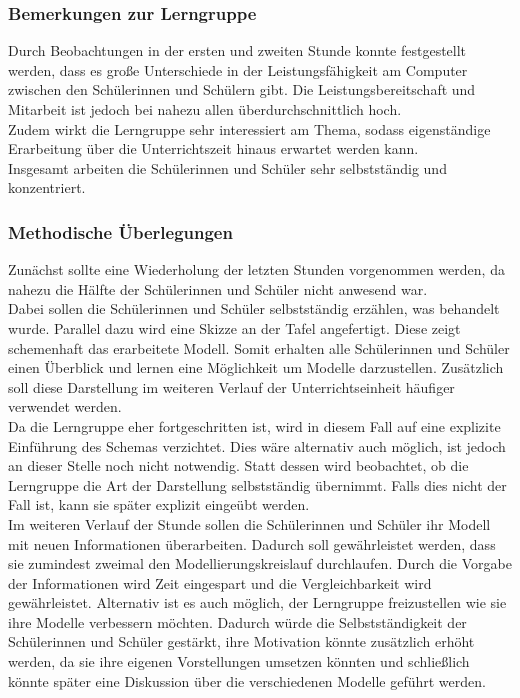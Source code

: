 \subsubsection{Bemerkungen zur Lerngruppe}
Durch Beobachtungen in der ersten und zweiten Stunde konnte festgestellt werden, dass es große Unterschiede in der Leistungsfähigkeit am Computer zwischen den Schülerinnen und Schülern gibt. Die Leistungsbereitschaft und Mitarbeit ist jedoch bei nahezu allen überdurchschnittlich hoch.\\ Zudem wirkt die Lerngruppe sehr interessiert am Thema, sodass eigenständige Erarbeitung über die Unterrichtszeit hinaus erwartet werden kann.\\
  Insgesamt arbeiten die Schülerinnen und Schüler sehr selbstständig und konzentriert. 
\subsubsection{Methodische Überlegungen}
Zunächst sollte eine Wiederholung der letzten Stunden vorgenommen werden, da nahezu die Hälfte der Schülerinnen und Schüler nicht anwesend war.\\
Dabei sollen die Schülerinnen und Schüler selbstständig erzählen, was behandelt wurde. Parallel dazu wird eine Skizze an der Tafel angefertigt. Diese zeigt schemenhaft das erarbeitete Modell. Somit erhalten alle Schülerinnen und Schüler einen Überblick und lernen eine Möglichkeit um Modelle darzustellen. Zusätzlich soll diese Darstellung im weiteren Verlauf der Unterrichtseinheit häufiger verwendet werden.\\
Da die Lerngruppe eher fortgeschritten ist, wird in diesem Fall auf eine explizite Einführung des Schemas verzichtet. Dies wäre alternativ auch möglich, ist jedoch an dieser Stelle noch nicht notwendig. Statt dessen wird beobachtet, ob die Lerngruppe die Art der Darstellung selbstständig übernimmt. Falls dies nicht der Fall ist, kann sie später explizit eingeübt werden.\\
Im weiteren Verlauf der Stunde sollen die Schülerinnen und Schüler ihr Modell mit neuen Informationen überarbeiten. Dadurch soll gewährleistet werden, dass sie zumindest zweimal den Modellierungskreislauf durchlaufen. Durch die Vorgabe der Informationen wird Zeit eingespart und die Vergleichbarkeit wird gewährleistet. Alternativ ist es auch möglich, der Lerngruppe freizustellen wie sie ihre Modelle verbessern möchten. Dadurch würde die Selbstständigkeit der Schülerinnen und Schüler gestärkt, ihre Motivation könnte zusätzlich erhöht werden, da sie ihre eigenen Vorstellungen umsetzen könnten und schließlich könnte später eine Diskussion über die verschiedenen Modelle geführt werden.\\
